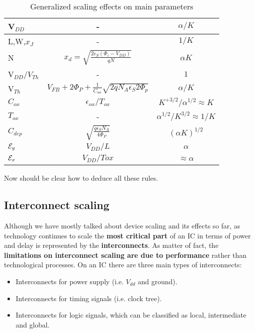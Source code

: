 \documentclass[a4paper, 12pt, twoside, openright]{report}
\begin{document}
\begin{enumerate}
\begin{table}[H]
{
   \begin{center}
  {
     \begin{tabular}{||l||c|c||}\hline
      V$_{DD}$ & -& $ {\alpha/K}$\\
      \hline
      L,W,$x_J$       &- & $ {1/K}$\\
      \hline
      N & $x_d=\sqrt{\frac{2\epsilon_S(\Phi_i-V_{DD})}{qN}}$&$ {\alpha K}$ \\
      \hline
      V$_{DD}/V_{Th}$ &- & ${1}$\\
      \hline
      V$_{Th}$ & $V_{FB}+2\Phi_P+\frac{1}{C_{ox}}\sqrt{2qN_A\epsilon_S 2\Phi_p}$  & $ {\alpha/K}$\\
      \hline
       $C_{ox}$&  $\epsilon_{ox}/T_{ox}$ &$ {K}^{+3/2}/\alpha^{1/2}\approx K $\\ 
      \hline
      $T_{ox}$       &- & $ {\alpha^{1/2}/{K}^{3/2}}\approx 1/K$\\
      \hline
       $C_{dep}$&  $\sqrt{\frac{q\epsilon_SN_A}{4\Phi_P}}$ &$ {(\alpha K)}^{1/2}$\\ 
      \hline
      ${\cal E}_y$ & $V_{DD}/L$ & $ {\alpha}$\\
      \hline
      ${\cal E}_x$ & $V_{DD}/Tox$ & $ {\approx \alpha}$\\
      \hline
     \end{tabular}
}
\caption{Generalized scaling effects on main parameters}
    \end{center}
}
\end{table}

Now should be clear how to deduce all these rules.

\end{enumerate}

\newpage

\subsection{Interconnect scaling}
Although we have mostly talked about device scaling and its effects so far, as technology continues to scale the \textbf{most critical part} of an IC in terms of power and delay is represented by the \textbf{interconnects}. As matter of fact, the \textbf{limitations on interconnect scaling are due to performance} rather than technological processes. On an IC there are three main types of interconnects: 

\begin{itemize}
\item Interconnects for power supply (i.e. $V_{dd}$ and ground).
\item Interconnects for timing signals (i.e. clock tree).
\item Interconnects for logic signals, which can be classified as local, intermediate and global.
\end{itemize}
\end{document}
